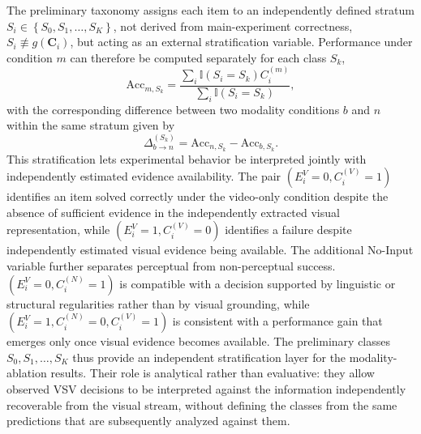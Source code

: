 \begin{description}
The preliminary taxonomy assigns each item to an independently defined stratum \(S_i \in \left\{S_0, S_1, \ldots, S_K\right\}\), not derived from main-experiment correctness, \(S_i \not\equiv g\left(\mathbf{C}_i\right)\), but acting as an external stratification variable. Performance under condition \(m\) can therefore be computed separately for each class \(S_k\),
\begin{equation}
\mathrm{Acc}_{m,S_k}
=
\frac{
\sum_{i}
\mathbb{I}
\left(
S_i=S_k
\right)
C_i^{(m)}
}{
\sum_{i}
\mathbb{I}
\left(
S_i=S_k
\right)
},
\end{equation}
with the corresponding difference between two modality conditions \(b\) and \(n\) within the same stratum given by
\begin{equation}
\Delta_{b \rightarrow n}^{(S_k)}
=
\mathrm{Acc}_{n,S_k}
-
\mathrm{Acc}_{b,S_k}.
\end{equation}
This stratification lets experimental behavior be interpreted jointly with independently estimated evidence availability. The pair \(\left(E_i^{V}=0, C_i^{(V)}=1\right)\) identifies an item solved correctly under the video-only condition despite the absence of sufficient evidence in the independently extracted visual representation, while \(\left(E_i^{V}=1, C_i^{(V)}=0\right)\) identifies a failure despite independently estimated visual evidence being available.
The additional No-Input variable further separates perceptual from non-perceptual success. \(\left(E_i^{V}=0, C_i^{(N)}=1\right)\) is compatible with a decision supported by linguistic or structural regularities rather than by visual grounding, while \(\left(E_i^{V}=1, C_i^{(N)}=0, C_i^{(V)}=1\right)\) is consistent with a performance gain that emerges only once visual evidence becomes available.
The preliminary classes \(S_0, S_1, \ldots, S_K\) thus provide an independent stratification layer for the modality-ablation results. Their role is analytical rather than evaluative: they allow observed VSV decisions to be interpreted against the information independently recoverable from the visual stream, without defining the classes from the same predictions that are subsequently analyzed against them.
\end{description}

